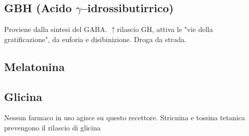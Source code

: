 \subsection{GBH (Acido $\gamma$--idrossibutirrico)}

Proviene dalla sintesi del GABA. $\uparrow$rilascio GH, attiva le "vie della gratificazione", da euforia e disibinizione. Droga da strada.

\subsection{Melatonina}





\subsection{Glicina}


Nessun farmaco in uso agisce su questo recettore. Stricnina e tossina tetanica prevengono il rilascio di glicina

\newpage
